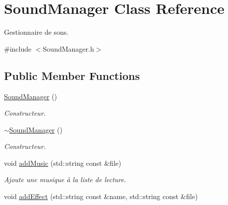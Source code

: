 \hypertarget{classSoundManager}{\section{Sound\+Manager Class Reference}
\label{classSoundManager}
}


Gestionnaire de sons.  




{\ttfamily \#include $<$Sound\+Manager.\+h$>$}

\subsection*{Public Member Functions}
\begin{DoxyCompactItemize}
\item 
\hypertarget{classSoundManager_abcc1fbf3488be5788a42c9a4fe56df35}{\hyperlink{classSoundManager_abcc1fbf3488be5788a42c9a4fe56df35}{Sound\+Manager} ()}\label{classSoundManager_abcc1fbf3488be5788a42c9a4fe56df35}

\begin{DoxyCompactList}\small\item\em Constructeur. \end{DoxyCompactList}\item 
\hypertarget{classSoundManager_ad5dbf8eab22db48ff8f3db51b02f8938}{\hyperlink{classSoundManager_ad5dbf8eab22db48ff8f3db51b02f8938}{$\sim$\+Sound\+Manager} ()}\label{classSoundManager_ad5dbf8eab22db48ff8f3db51b02f8938}

\begin{DoxyCompactList}\small\item\em Constructeur. \end{DoxyCompactList}\item 
\hypertarget{classSoundManager_a6dcfd41960f3034460c601b04a1a1eb7}{void \hyperlink{classSoundManager_a6dcfd41960f3034460c601b04a1a1eb7}{add\+Music} (std\+::string const \&file)}\label{classSoundManager_a6dcfd41960f3034460c601b04a1a1eb7}

\begin{DoxyCompactList}\small\item\em Ajoute une musique à la liste de lecture. \end{DoxyCompactList}\item 
\hypertarget{classSoundManager_adf63b6806ffcc147633d5c3982b3f2ff}{void \hyperlink{classSoundManager_adf63b6806ffcc147633d5c3982b3f2ff}{add\+Effect} (std\+::string const \&name, std\+::string const \&file)}\label{classSoundManager_adf63b6806ffcc147633d5c3982b3f2ff}


\end{DoxyCompactItemize}
